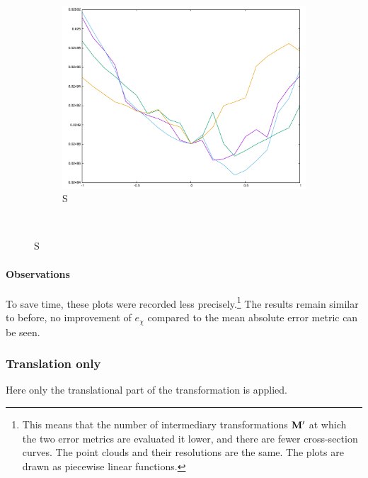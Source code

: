 {\begin{figure}[H]
\begin{subfigure}{.33\textwidth}
	\includegraphics[width=\linewidth]{fig/ajherr/t3/S_mae.pdf}
	\caption{S}
\end{subfigure}\\
\end{figure}


\paragraph{Observations} To save time, these plots were recorded less precisely.\footnote{This means that the number of intermediary transformations $\mathbf{M'}$ at which the two error metrics are evaluated it lower, and there are fewer cross-section curves. The point clouds and their resolutions are the same. The plots are drawn as piecewise linear functions.} The results remain similar to before, no improvement of $e_{\chi}$ compared to the mean absolute error metric can be seen. 


\subsubsection{Translation only}
Here only the translational part of the transformation is applied.

}
